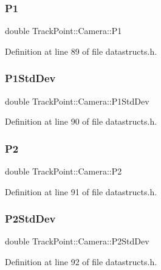 \subsubsection{\texorpdfstring{P1}{P1}}
{\footnotesize\ttfamily double Track\+Point\+::\+Camera\+::\+P1}



Definition at line 89 of file datastructs.\+h.

\mbox{\label{struct_track_point_1_1_camera_a461dd632532b53dce9fda6bb8dd4678d}} 
\subsubsection{\texorpdfstring{P1StdDev}{P1StdDev}}
{\footnotesize\ttfamily double Track\+Point\+::\+Camera\+::\+P1\+Std\+Dev}



Definition at line 90 of file datastructs.\+h.

\mbox{\label{struct_track_point_1_1_camera_ac7bb7fbe6db73bd7e7b5fdd5f4c395d3}} 
\subsubsection{\texorpdfstring{P2}{P2}}
{\footnotesize\ttfamily double Track\+Point\+::\+Camera\+::\+P2}



Definition at line 91 of file datastructs.\+h.

\mbox{\label{struct_track_point_1_1_camera_a699fa08a211ab8a6690a7f5ad36bcf75}} 
\subsubsection{\texorpdfstring{P2StdDev}{P2StdDev}}
{\footnotesize\ttfamily double Track\+Point\+::\+Camera\+::\+P2\+Std\+Dev}



Definition at line 92 of file datastructs.\+h.


